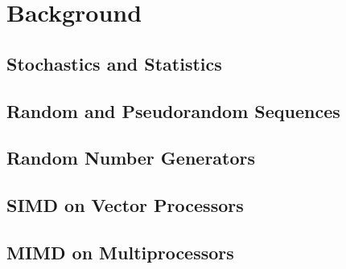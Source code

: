 \documentclass[crop=false]{standalone}
\begin{document}
  \section{Background} %
  \label{sec:background}
    \subsection{Stochastics and Statistics} %
    \label{sub:stochastics_and_statistics}


    \subsection{Random and Pseudorandom Sequences} %
    \label{sub:random_and_pseudorandom_sequences}


    \subsection{Random Number Generators} %
    \label{sub:random_number_generators}


    \subsection{SIMD on Vector Processors} %
    \label{sub:vector_processors}


    \subsection{MIMD on Multiprocessors} %
    \label{sub:parallelization}

\end{document}
